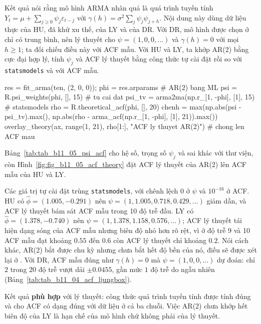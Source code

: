 Kết quả  nói rằng mô hình ARMA nhân quả là quá trình tuyến tính $Y_t=\mu+\sum_{j\ge0}\psi_j\varepsilon_{t-j}$ với $\gamma(h)=\sigma^2\sum_j\psi_j\psi_{j+h}$.
 Nội dung này dùng dữ liệu thực của HU, đã khử xu thế, của LY và của DR. Với DR, mô hình được chọn ở  chỉ có trung bình, nên lý thuyết cho $\psi=(1,0,0,\dots)$ và $\gamma(h)=0$ với mọi $h\ge1$; ta đối chiếu điều này với ACF mẫu. Với HU và LY, ta khớp AR(2) bằng cực đại hợp lý, tính $\psi_j$ và ACF lý thuyết bằng công thức tự cài đặt rồi so với \texttt{statsmodels} và với ACF mẫu.
\begin{codeblock}
res = fit_arma(ten, (2, 0, 0)); phi = res.arparams           # AR(2) bang ML
psi = R.psi_weights(phi, [], 15)                              # tu cai dat
psi_tv = arma2ma(np.r_[1, -phi], [1], 15)                     # statsmodels
rho = R.theoretical_acf(phi, [], 20)
chenh = max(np.abs(psi - psi_tv).max(), np.abs(rho - arma_acf(np.r_[1, -phi], [1], 21)).max())
overlay_theory(ax, range(1, 21), rho[1:], "ACF ly thuyet AR(2)")     # chong len ACF mau
\end{codeblock}
 Bảng~\ref{tab:tab_b11_05_psi_acf} cho hệ số, trọng số $\psi_j$ và sai khác với thư viện, còn Hình~\ref{fig:fig_b11_05_acf_theory} đặt ACF lý thuyết của AR(2) lên ACF mẫu của HU và LY.

 Các giá trị tự cài đặt trùng \texttt{statsmodels}, với chênh lệch $0$ ở $\psi$ và $10^{-16}$ ở ACF. HU có $\hat\phi=(1.005,-0.291)$ nên $\psi=(1,1.005,0.718,0.429,\dots)$ giảm dần, và ACF lý thuyết bám sát ACF mẫu trong 10 độ trễ đầu. LY có $\hat\phi=(1.378,-0.740)$ nên $\psi=(1,1.378,1.158,0.576,\dots)$; ACF lý thuyết tái hiện dạng sóng của ACF mẫu nhưng biên độ nhỏ hơn rõ rệt, vì ở độ trễ 9 và 10 ACF mẫu đạt khoảng $0.55$ đến $0.6$ còn ACF lý thuyết chỉ khoảng $0.2$. Nói cách khác, AR(2) bắt được chu kỳ nhưng chưa bắt hết độ bền của nó, điều sẽ được xét lại ở . Với DR, ACF mẫu đúng như $\gamma(h)=0$ mà $\psi=(1,0,0,\dots)$ dự đoán: chỉ $2$ trong $20$ độ trễ vượt dải $\pm0.0455$, gần mức $1$ độ trễ do ngẫu nhiên (Bảng~\ref{tab:tab_b11_04_acf_ljungbox}).

 Kết quả \textbf{phù hợp} với lý thuyết: công thức quá trình tuyến tính được tính đúng và cho ACF có dạng đúng với dữ liệu ở cả ba chuỗi. Việc AR(2) chưa khớp hết biên độ của LY là hạn chế của mô hình chứ không phải của lý thuyết.

